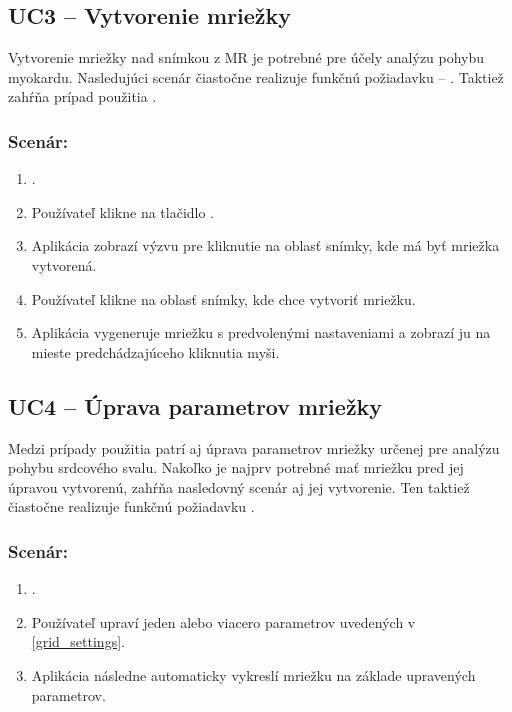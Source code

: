 \subsection {UC3 -- Vytvorenie mriežky}\label{uc3}
Vytvorenie mriežky nad snímkou z MR je potrebné pre účely analýzu pohybu myokardu. Nasledujúci scenár čiastočne realizuje funkčnú požiadavku -- . Taktiež zahŕňa prípad použitia .

\clearpage

\subsubsection*{Scenár:}
\begin {enumerate}
\item {.}
\item {Používateľ klikne na tlačidlo .}
\item {Aplikácia zobrazí výzvu pre kliknutie na oblasť snímky, kde má byť mriežka vytvorená.}
\item {Používateľ klikne na oblasť snímky, kde chce vytvoriť mriežku.}
\item {Aplikácia vygeneruje mriežku s predvolenými nastaveniami a zobrazí ju na mieste predchádzajúceho kliknutia myši.}
\end {enumerate}

\subsection {UC4 -- Úprava parametrov mriežky}\label{uc4}
Medzi prípady použitia patrí aj úprava parametrov mriežky určenej pre analýzu pohybu srdcového svalu. Nakoľko je najprv potrebné mať mriežku pred jej úpravou vytvorenú, zahŕňa nasledovný scenár aj jej vytvorenie. Ten taktiež čiastočne realizuje funkčnú požiadavku .

\subsubsection*{Scenár:}
\begin {enumerate}
\item {.}
\item {Používateľ upraví jeden alebo viacero parametrov uvedených v \ref{grid_settings}.}
\item {Aplikácia následne automaticky vykreslí mriežku na základe upravených parametrov.}
\end {enumerate}


